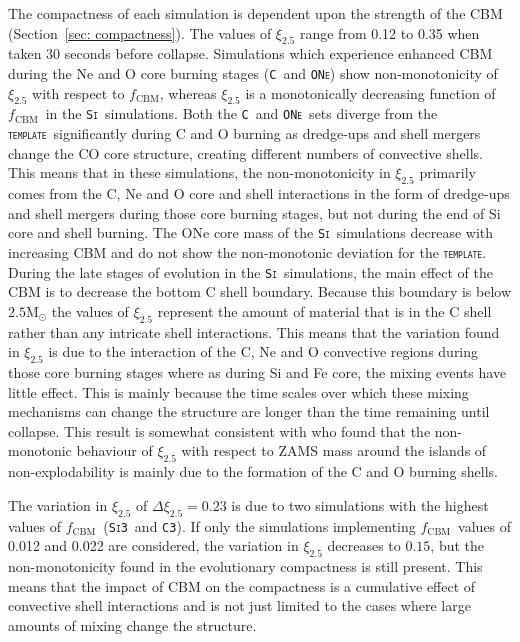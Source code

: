\documentclass[useAMS,usenatbib]{mn2e}
\newcommand{\Msun}{\ensuremath{\mathrm{M}_\odot}}
\newcommand{\fcbm}{\ensuremath{f_\mathrm{CBM}}}
\newcommand{\template}{\textsc{\texttt{template}}}
\newcommand{\Cc}{\textsc{\texttt{C3}}}
\newcommand{\Sic}{\textsc{\texttt{Si3}}}
\newcommand{\C}{\textsc{\texttt{C}}}
\newcommand{\ONe}{\textsc{\texttt{ONe}}}
\newcommand{\Si}{\textsc{\texttt{Si}}}
\begin{document}

The compactness of each simulation is dependent upon the strength of the CBM
(Section~\ref{sec: compactness}). The values of $\xi_{2.5}$ range from 0.12 to
0.35 when taken 30 seconds before collapse. Simulations which experience
enhanced CBM during the Ne and O core burning stages (\C~and \ONe) show 
non-monotonicity of $\xi_{2.5}$ with respect to \fcbm, whereas
$\xi_{2.5}$ is a monotonically decreasing function of \fcbm~in the
\Si~simulations.  Both the \C~and \ONe~sets diverge from the
\template~significantly during C and O burning as dredge-ups and shell mergers 
change the CO core structure, creating different numbers of convective shells. 
This means that in these simulations, the non-monotonicity in
$\xi_{2.5}$ primarily comes from the C, Ne and O core and shell interactions in
the form of dredge-ups and shell mergers during those core burning stages, but
not during the end of Si core and shell burning. The ONe core mass of the
\Si~simulations decrease with increasing CBM and do not show the non-monotonic
deviation for the \template. During the late stages of evolution in the
\Si~simulations, the main effect of the CBM is to decrease the bottom C shell
boundary. Because this boundary is below $2.5\Msun$ the values
of $\xi_{2.5}$ represent the amount of material that is in the C shell rather
than any intricate shell interactions. This means that the variation found in $\xi_{2.5}$ 
is due to the interaction of the C, Ne and O convective regions during those core 
burning stages where as during Si and Fe core, the mixing events have little effect. 
This is mainly because the time scales over which
these mixing mechanisms can change the structure are longer than the time
remaining until collapse. This result is somewhat consistent with \citet{Sukhbold2017}
who found that the non-monotonic behaviour of $\xi_{2.5}$ with respect to ZAMS
mass around the islands of non-explodability is mainly due to the formation of
the C and O burning shells. 
 
The variation in $\xi_{2.5}$ of $\Delta \xi_{2.5} = 0.23$ is due to two
simulations with the highest values of \fcbm~(\Sic~and \Cc). If only the
simulations implementing \fcbm~values of 0.012 and 0.022 are considered, the
variation in $\xi_{2.5}$ decreases to $0.15$, but the non-monotonicity
found in the evolutionary compactness is still present. This means that the
impact of CBM on the compactness is a cumulative effect of convective shell
interactions and is not just limited to the cases where large amounts of mixing
change the structure.
\end{document}
